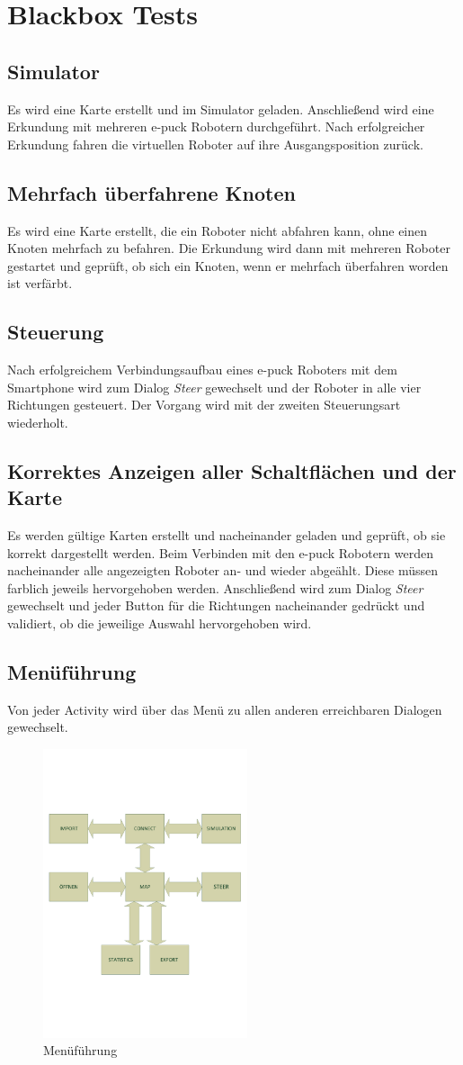 \documentclass[10pt,a4paper]{article}
\begin{document}
	
	\section{Blackbox Tests}
		\subsection{Simulator}
			Es wird eine Karte erstellt und im Simulator geladen. Anschlie\ss end wird eine Erkundung mit mehreren e-puck Robotern durchgef\"uhrt. Nach erfolgreicher
			Erkundung fahren die virtuellen Roboter auf ihre Ausgangsposition zur\"uck.
		\subsection{Mehrfach \"uberfahrene Knoten}
			Es wird eine Karte erstellt, die ein Roboter nicht abfahren kann, ohne einen Knoten mehrfach zu befahren. Die Erkundung wird dann mit mehreren Roboter 
 			gestartet und gepr\"uft, ob sich ein Knoten, wenn er mehrfach \"uberfahren worden ist verf\"arbt.
		\subsection{Steuerung}
			Nach erfolgreichem Verbindungsaufbau eines e-puck Roboters mit dem Smartphone wird zum Dialog \textit{Steer} gewechselt und der Roboter in alle vier
			Richtungen gesteuert. Der Vorgang wird mit der zweiten Steuerungsart wiederholt.		
		\subsection{Korrektes Anzeigen aller Schaltfl\"achen und der Karte}
			Es werden g\"ultige Karten erstellt und nacheinander geladen und gepr\"uft, ob sie korrekt dargestellt werden. Beim Verbinden mit den e-puck Robotern werden 
			nacheinander alle angezeigten Roboter an- und wieder abge\"ahlt. Diese m\"ussen farblich jeweils hervorgehoben werden. Anschlie\ss end wird zum Dialog 
			\textit{Steer} gewechselt und jeder Button f\"ur die Richtungen nacheinander gedr\"uckt und validiert, ob die jeweilige Auswahl hervorgehoben wird.
		\subsection{Men\"uf\"uhrung}
			Von jeder Activity wird \"uber das Men\"u zu allen anderen erreichbaren Dialogen gewechselt.
		\begin{figure}[htbp]
		\centering
			\includegraphics[width = 6cm]{images/Zeichnung1}
			\caption{Men\"uf\"uhrung}
		\end{figure}
		

				 			
\end{document}
